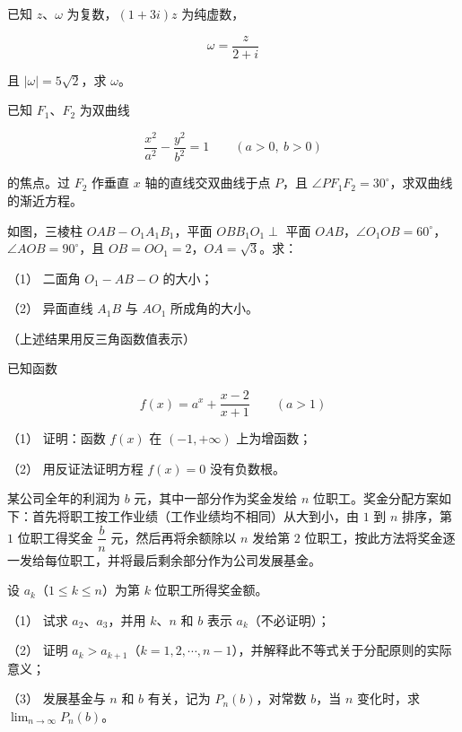 \begin{question}
已知 $z\text{、}\omega$ 为复数，$(1+3i)z$ 为纯虚数，

\nopagebreak[4]
\[
\omega=\frac z{2+i}
\]

且 $|\omega|=5\sqrt2$，求 $\omega$。

\end{question}
\begin{question}
已知 $F_1\text{、}F_2$ 为双曲线

\nopagebreak[4]
\[
\frac{x^2}{a^2}-\frac{y^2}{b^2}=1\qquad(a>0,\ b>0)
\]

的焦点。过 $F_2$ 作垂直 $x$ 轴的直线交双曲线于点 $P$，且 $\angle PF_1F_2=30^\circ$，求双曲线的渐近方程。

\Needspace{0.4\textheight}
\end{question}
\begin{question}
如图，三棱柱 $OAB-O_1A_1B_1$，平面 $OBB_1O_1\perp$ 平面 $OAB$，$\angle O_1OB=60^\circ$，$\angle AOB=90^\circ$，且 $OB=OO_1=2$，$OA=\sqrt3$。求：
\nopagebreak[4]
\begin{center}\end{center}
\nopagebreak[4]
（1） 二面角 $O_1-AB-O$ 的大小；

（2） 异面直线 $A_1B$ 与 $AO_1$ 所成角的大小。

（上述结果用反三角函数值表示）

\end{question}
\begin{question}
已知函数

\nopagebreak[4]
\[
f(x)=a^x+\frac{x-2}{x+1}\qquad(a>1)
\]

（1） 证明：函数 $f(x)$ 在 $(-1,+\infty)$ 上为增函数；

（2） 用反证法证明方程 $f(x)=0$ 没有负数根。

\end{question}
\begin{question}
某公司全年的利润为 $b$ 元，其中一部分作为奖金发给 $n$ 位职工。奖金分配方案如下：首先将职工按工作业绩（工作业绩均不相同）从大到小，由 $1$ 到 $n$ 排序，第 $1$ 位职工得奖金 $\dfrac bn$ 元，然后再将余额除以 $n$ 发给第 $2$ 位职工，按此方法将奖金逐一发给每位职工，并将最后剩余部分作为公司发展基金。

设 $a_k$（$1\le k\le n$）为第 $k$ 位职工所得奖金额。

（1） 试求 $a_2\text{、}a_3$，并用 $k\text{、}n$ 和 $b$ 表示 $a_k$（不必证明）；

（2） 证明 $a_k>a_{k+1}$（$k=1,2,\cdots,n-1$），并解释此不等式关于分配原则的实际意义；

（3） 发展基金与 $n$ 和 $b$ 有关，记为 $P_n(b)$，对常数 $b$，当 $n$ 变化时，求 $\displaystyle\lim_{n\to\infty}P_n(b)$。

\end{question}

